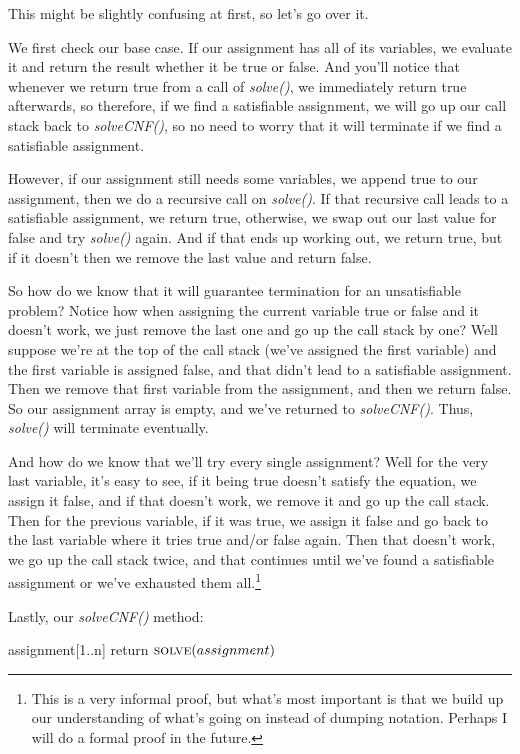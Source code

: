 This might be slightly confusing at first, so let's go over it.

We first check our base case. If our assignment has all of its variables, we
evaluate it and return the result whether it be true or false. And you'll notice
that whenever we return true from a call of \textit{solve()}, we immediately
return true afterwards, so therefore, if we find a satisfiable assignment, we
will go up our call stack back to \textit{solveCNF()}, so no need to worry that
it will terminate if we find a satisfiable assignment.

However, if our assignment still needs some variables, we append true to our
assignment, then we do a recursive call on \textit{solve()}. If that recursive
call leads to a satisfiable assignment, we return true, otherwise, we swap out
our last value for false and try \textit{solve()} again. And if that ends up
working out, we return true, but if it doesn't then we remove the last value
and return false.

So how do we know that it will guarantee termination for an unsatisfiable problem?
Notice how when assigning the current variable true or false and it doesn't
work, we just remove the last one and go up the call stack by one? Well
suppose we're at the top of the call stack (we've assigned the first variable)
and the first variable is assigned false, and that didn't lead to a satisfiable
assignment. Then we remove that first variable from the assignment, and then
we return false. So our assignment array is empty, and we've returned to
\textit{solveCNF()}. Thus, \textit{solve()} will terminate eventually.

And how do we know that we'll try every single assignment?
Well for the very last variable, it's easy to see, if it being true doesn't satisfy
the equation, we assign it false, and if that doesn't work, we remove it and go
up the call stack. Then for the previous variable, if it was true, we assign it
false and go back to the last variable where it tries true and/or false again.
Then that doesn't work, we go up the call stack twice, and that continues until
we've found a satisfiable assignment or we've exhausted them all.\footnote{
This is a very informal proof, but what's most important is that we build up
our understanding of what's going on instead of dumping notation. Perhaps I
will do a formal proof in the future.}

Lastly, our \textit{solveCNF()} method:

\begin{algorithm}[H]
\caption{Main Solving Method}\label{alg:8}
\begin{algorithmic}[1]


\State assignment[1..n]
\State return $\Call{solve}{assignment}$

\EndProcedure
\end{algorithmic}
\end{algorithm}

